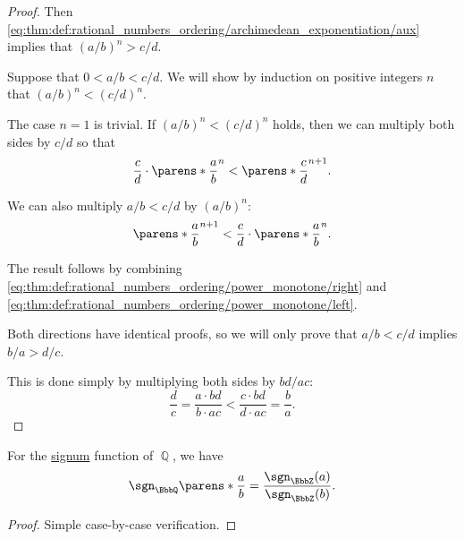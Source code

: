 \begin{proof}
  Then \eqref{eq:thm:def:rational_numbers_ordering/archimedean_exponentiation/aux} implies that \( (a / b)^n > c / d \).

   Suppose that \( 0 < a / b < c / d \). We will show by induction on positive integers \( n \) that \( (a / b)^n < (c / d)^n \).

  The case \( n = 1 \) is trivial. If \( (a / b)^n < (c / d)^n \) holds, then we can multiply both sides by \( c / d \) so that
  \begin{equation}\label{eq:thm:def:rational_numbers_ordering/power_monotone/right}
    \frac c d \cdot \parens*{ \frac a b }^n < \parens*{ \frac c d }^{n+1}.
  \end{equation}

  We can also multiply \( a / b < c / d \) by \( (a / b)^n \):
  \begin{equation}\label{eq:thm:def:rational_numbers_ordering/power_monotone/left}
    \parens*{ \frac a b }^{n + 1} < \frac c d \cdot \parens*{ \frac a b }^n.
  \end{equation}

  The result follows by combining \eqref{eq:thm:def:rational_numbers_ordering/power_monotone/right} and \eqref{eq:thm:def:rational_numbers_ordering/power_monotone/left}.

   Both directions have identical proofs, so we will only prove that \( a / b < c / d \) implies \( b / a > d / c \).

  This is done simply by multiplying both sides by \( {bd} / {ac} \):
  \begin{equation*}
    \frac d c = \frac {a \cdot bd} {b \cdot ac} < \frac {c \cdot bd} {d \cdot ac} = \frac b a.
  \end{equation*}
\end{proof}

\begin{proposition}\label{thm:rational_number_signum}\mimprovised
  For the \hyperref[def:signum]{signum} function of \( \BbbQ \), we have
  \begin{equation*}
    \sgn_\BbbQ\parens*{ \frac a b } = \frac {\sgn_\BbbZ(a)} {\sgn_\BbbZ(b)}.
  \end{equation*}
\end{proposition}
\begin{proof}
  Simple case-by-case verification.
\end{proof}

